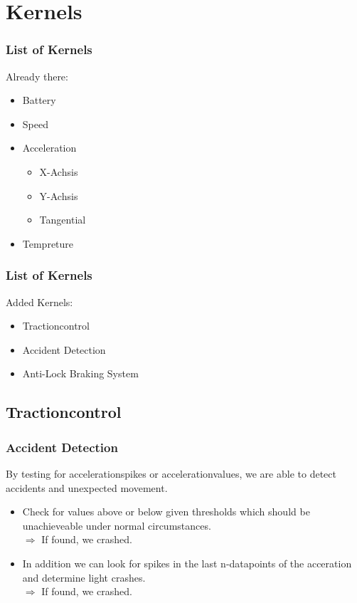 \documentclass{beamer}
\begin{document}
\section{Kernels}
\begin{frame} %
  \frametitle{List of Kernels} %
  Already there:
  \begin{itemize}
   \item Battery
   \item Speed
   \item Acceleration
   \begin{itemize}
    \item X-Achsis
    \item Y-Achsis
    \item Tangential
   \end{itemize}
   \item Tempreture
  \end{itemize}

\end{frame}
\begin{frame}
    \frametitle{List of Kernels}
    Added Kernels:
    \begin{itemize}
     \item Tractioncontrol
     \item Accident Detection
     \item Anti-Lock Braking System
    \end{itemize}
\end{frame}
\subsection{Tractioncontrol}
\begin{frame}
    \frametitle{Accident Detection}
    By testing for accelerationspikes or accelerationvalues, we are able to detect accidents and unexpected movement.\\
    \begin{itemize}
     \item Check for values above or below given thresholds which should be unachieveable under normal circumstances.\\
     $\Rightarrow$ If found, we crashed.
     \pause
     \item In addition we can look for spikes in the last n-datapoints of the acceration and determine light crashes.\\
     $\Rightarrow$ If found, we crashed.
     \pause
    \end{itemize}
\end{frame}
\end{document}
